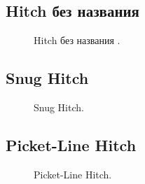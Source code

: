 \addtocounter{HitchNoName}{1}

\subsection{Hitch без названия }

\begin{figure}[H]\centering
	\begin{minipage}{1\linewidth}
		\begin{center}
			\tcbox[enhanced jigsaw,colframe=black,opacityframe=0.5,opacityback=0.5]
			{\centering{}}
		\end{center}
	\end{minipage}
\caption{Hitch без названия .}
\label{ris:Hitch_noname_4}
\end{figure}

\subsection{Snug Hitch}

\begin{figure}[H]\centering
	\begin{minipage}{1\linewidth}
		\begin{center}
			\tcbox[enhanced jigsaw,colframe=black,opacityframe=0.5,opacityback=0.5]
			{\centering{}}
		\end{center}
	\end{minipage}
\caption{Snug Hitch.}
\label{ris:Snug_Hitch}
\end{figure}

\subsection{Picket-Line Hitch}

\begin{figure}[H]\centering
	\begin{minipage}{1\linewidth}
		\begin{center}
			\tcbox[enhanced jigsaw,colframe=black,opacityframe=0.5,opacityback=0.5]
			{\centering{}}
		\end{center}
	\end{minipage}
\caption{Picket-Line Hitch.}
\label{ris:Picket-Line_Hitch}
\end{figure}

